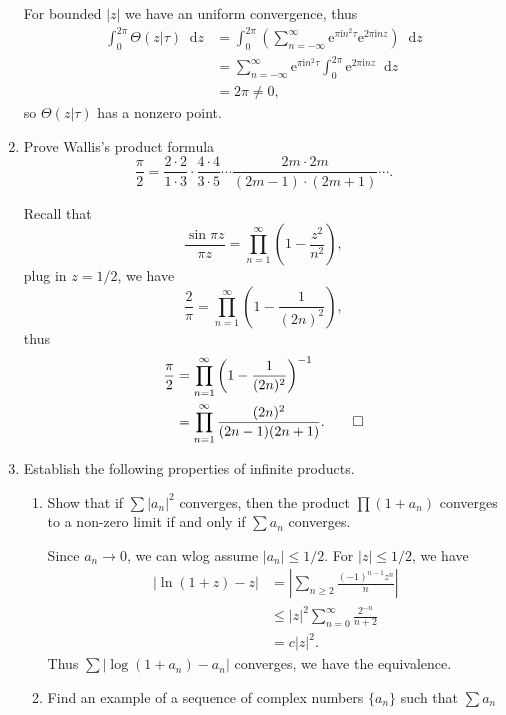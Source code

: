 \documentclass[11pt]{report}
\theoremstyle{mythm}
\let\oldendproof\endproof
\renewenvironment{proof}[1][\proofname]{%
  \oldproof[\normalfont \bfseries #1]%
}{\oldendproof}
\renewcommand*{\proofname}{Proof}
\theoremstyle{myans}
\newcommand{\mi}{\mathrm{i}}
\newcommand{\me}{\mathrm{e}}
\newcommand{\dd}{\mathop{}\!\mathrm{d}}
\begin{document}
\begin{enumerate}
\begin{proof}
    For bounded $|z|$ we have an uniform convergence, thus
    \begin{align*}
      \int_0^{2\pi} \Theta(z|\tau) \dd z &= \int_0^{2\pi} \left(\sum_{n=-\infty}^{\infty} \me^{\pi \mi n^2 \tau} \me^{2\pi \mi n z}\right) \dd z\\
      &= \sum_{n=-\infty}^{\infty} \me^{\pi \mi n^2 \tau} \int_0^{2\pi}  \me^{2\pi \mi n z}\dd z\\
      &= 2\pi \neq 0,
    \end{align*}
    so $\Theta(z|\tau)$ has a nonzero point.
  \end{proof}
  \setcounter{enumi}{5}
  \item Prove Wallis's product formula
  \[ \frac{\pi}{2} = \frac{2\cdot 2}{1\cdot 3} \cdot \frac{4\cdot 4}{3\cdot 5}
  \cdots \frac{2m\cdot 2m}{(2m-1)\cdot(2m+1)}\cdots. \]
  \begin{proof}
    Recall that
    \[ \frac{\sin \pi z}{\pi z} =\prod_{n=1}^\infty \left(1- \frac {z^2}{n^2}\right), \]
    plug in $z=1/2$, we have
    \[ \frac 2 \pi = \prod_{n=1}^\infty \left(1 - \frac 1{(2n)^2}\right), \]
    thus
    \begin{align*}
      \frac \pi 2 &= \prod_{n=1}^\infty \left(1 - \frac 1{(2n)^2}\right)^{-1}\\
      &= \prod_{n=1}^\infty \frac{(2n)^2}{(2n-1)(2n+1)}. \qedhere
    \end{align*}
  \end{proof}
  \item Establish the following properties of infinite products.
  \begin{enumerate}
    \item Show that if $\sum |a_n|^2$ converges, then the product $\prod(1 + a_n)$ converges to a
    non-zero limit if and only if $\sum a_n$ converges.
    \begin{proof}
      Since $a_n\to 0$, we can wlog assume $|a_n|\leq 1/2$. For $|z|\leq 1/2$, we have
      \begin{align*}
        \left|\ln(1+z) - z \right| &= \left| \sum_{n\geq 2} \frac{(-1)^{n-1} z^n}{n} \right|\\
        &\leq |z|^2 \sum_{n=0}^{\infty} \frac{2^{-n}}{n+2}\\
        &= c|z|^2.
      \end{align*}
      Thus $\sum \left|\log (1 + a_n) - a_n\right|$ converges, we have the equivalence.
    \end{proof}
    \item Find an example of a sequence of complex numbers $\{a_n\}$ such that $\sum a_n$

\end{enumerate}
\end{enumerate}
\end{document}
